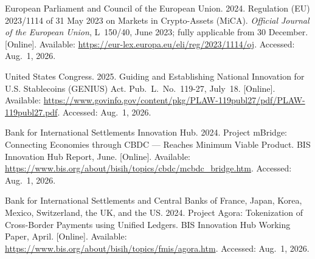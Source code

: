 \documentclass[12pt,a4paper]{report}
\begin{document}
{\begin{enumerate}[label={[\arabic*]}]

\item European Parliament and Council of the European Union. 2024. Regulation (EU) 2023/1114 of 31 May 2023 on Markets in Crypto-Assets (MiCA). \emph{Official Journal of the European Union}, L~150/40, June 2023; fully applicable from 30 December. [Online]. Available: \url{https://eur-lex.europa.eu/eli/reg/2023/1114/oj}. Accessed: Aug.~1, 2026.


\item United States Congress. 2025. Guiding and Establishing National Innovation for U.S. Stablecoins (GENIUS) Act. Pub.~L.~No.~119-27, July~18. [Online]. Available: \url{https://www.govinfo.gov/content/pkg/PLAW-119publ27/pdf/PLAW-119publ27.pdf}. Accessed: Aug.~1, 2026.

\item Bank for International Settlements Innovation Hub. 2024. Project mBridge: Connecting Economies through CBDC --- Reaches Minimum Viable Product. BIS Innovation Hub Report, June. [Online]. Available: \url{https://www.bis.org/about/bisih/topics/cbdc/mcbdc_bridge.htm}. Accessed: Aug.~1, 2026.

\item Bank for International Settlements and Central Banks of France, Japan, Korea, Mexico, Switzerland, the UK, and the US. 2024. Project Agora: Tokenization of Cross-Border Payments using Unified Ledgers. BIS Innovation Hub Working Paper, April. [Online]. Available: \url{https://www.bis.org/about/bisih/topics/fmis/agora.htm}. Accessed: Aug.~1, 2026.



\end{enumerate}}
\end{document}
